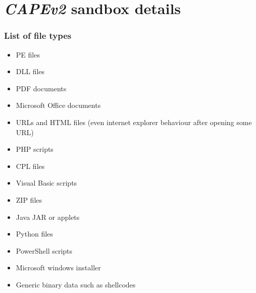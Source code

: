 \chapter{\emph{CAPEv2} sandbox details} \label{app:cape}

\subsection*{List of file types}
\begin{itemize}
    \itemsep0em 
    \item PE files
    \item DLL files
    \item PDF documents
    \item Microsoft Office documents
    \item URLs and HTML files (even internet explorer behaviour after opening some URL)
    \item PHP scripts
    \item CPL files
    \item Visual Basic scripts
    \item ZIP files
    \item Java JAR or applets
    \item Python files 
    \item PowerShell scripts
    \item Microsoft windows installer
    \item Generic binary data such as shellcodes
  \end{itemize}

\newpage

